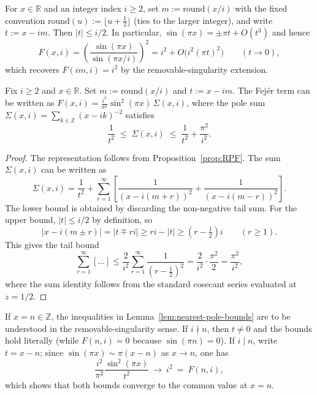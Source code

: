 \begin{definition}\label{def:nearest-lattice}
For $x\in\mathbb{R}$ and an integer index $i\ge2$, set $m:=\mathrm{round}(x/i)$ with the fixed convention $\mathrm{round}(u):=\lfloor u+\tfrac12\rfloor$ (ties to the larger integer), and write $t:=x-im$. Then $|t|\le i/2$. In particular, $\sin(\pi x)=\pm \pi t+O(t^{3})$ and hence
\[
F(x,i)=\left(\frac{\sin(\pi x)}{\sin(\pi x/i)}\right)^{\!2}
=i^{2}+O\!\bigl(i^{2}(\pi t)^{2}\bigr)\qquad(t\to0),
\]
which recovers $F(im,i)=i^{2}$ by the removable-singularity extension.
\end{definition}

\begin{lemma}\label{lem:nearest-pole-bounds}
Fix $i\ge2$ and $x\in\mathbb{R}$. Set $m:=\mathrm{round}(x/i)$ and $t:=x-i m$. The Fej\'er term can be written as $F(x,i) = \frac{i^2}{\pi^2}\sin^2(\pi x)\,\Sigma(x,i)$, where the pole sum $\Sigma(x,i) = \sum_{k\in\mathbb{Z}}(x-i k)^{-2}$ satisfies
\[
\frac{1}{t^2} \;\le\; \Sigma(x,i) \;\le\; \frac{1}{t^2} + \frac{\pi^2}{i^2}.
\]
\end{lemma}

\begin{proof}
The representation follows from Proposition~\ref{prop:RPF}. The sum $\Sigma(x,i)$ can be written as
\[
\Sigma(x,i) = \frac{1}{t^2}+\sum_{r=1}^{\infty}\left[\frac{1}{(x-i(m+r))^{2}}+\frac{1}{(x-i(m-r))^{2}}\right].
\]
The lower bound is obtained by discarding the non-negative tail sum. For the upper bound, $|t|\le i/2$ by definition, so
\[
|x-i(m\pm r)| = |t\mp ri| \ge ri - |t| \ge (r-\tfrac12)i\qquad(r\ge1).
\]
This gives the tail bound
\[
\sum_{r=1}^{\infty}\left[\dots\right] \le \frac{2}{i^2}\sum_{r=1}^{\infty}\frac{1}{(r-\tfrac12)^2} = \frac{2}{i^2}\cdot\frac{\pi^2}{2} = \frac{\pi^2}{i^2},
\]
where the sum identity follows from the standard cosecant series evaluated at $z=1/2$.
\end{proof}

\begin{remark}
If $x=n\in\mathbb{Z}$, the inequalities in Lemma~\ref{lem:nearest-pole-bounds} are to be understood in the removable-singularity sense. If $i\nmid n$, then $t\neq0$ and the bounds hold literally (while $F(n,i)=0$ because $\sin(\pi n)=0$). If $i\mid n$, write $t=x-n$; since $\sin(\pi x)\sim \pi(x-n)$ as $x\to n$, one has
\[
\frac{i^{2}}{\pi^{2}}\frac{\sin^{2}(\pi x)}{t^{2}}\ \longrightarrow\ i^{2}\ =\ F(n,i),
\]
which shows that both bounds converge to the common value at $x=n$.
\end{remark}

